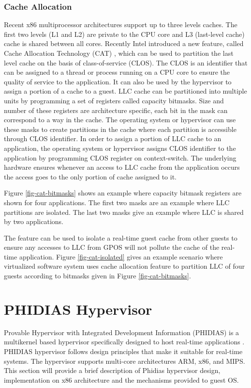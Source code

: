 

\subsubsection{Cache Allocation} \label{sec:cat}
Recent x86 multiprocessor architectures support up to three levels caches. 
The first two levels (L1 and L2) are private to the CPU core and L3 (last-level cache) cache is shared between all cores. 
Recently Intel introduced a new feature, called Cache Allocation Technology (CAT) \cite{intel-sdm-vol3}, which can be used to partition the last
level cache on the basis of class-of-service (CLOS). 
The CLOS is an identifier that can be assigned to a thread or process running on a CPU core to ensure the quality of service to the application. 
It can also be used by the hypervisor to assign a portion of a cache to a guest.
LLC cache can be partitioned into multiple units by programming a set of registers called capacity bitmasks. Size and number of these registers are
architecture specific, each bit in the mask can correspond to a way in the cache. 
The operating system or hypervisor can use these masks to create 
partitions in the cache where each partition is accessible through CLOS identifier. 
In order to assign a portion of LLC cache to an application,
the operating system or hypervisor assigns CLOS identifier to the application by programming CLOS register on context-switch.
The underlying hardware ensures whenever an access to LLC cache from the application occurs the access goes to the only portion of cache assigned to it.


Figure \ref{fig-cat-bitmasks} shows an example where capacity bitmask registers are shown for four applications. The first two masks are 
an example where LLC partitions are isolated. The last two masks give an example where LLC is shared by two applications.

The feature can be used to isolate a real-time guest cache from other guests to ensure any accesses to LLC from GPOS
will not pollute the cache of the real-time application. Figure \ref{fig-cat-isolated} gives an example scenario where virtualized software system
uses cache allocation feature to partition LLC of four guests according to bitmasks given in Figure \ref{fig-cat-bitmasks}.



\section{PHIDIAS Hypervisor}
Provable Hypervisor with Integrated Development Information (PHIDIAS) is a multikernel based hypervisor specifically designed to host real-time applications \cite{nordholz2017design}. 
PHIDIAS hypervisor follows design principles that make it suitable for real-time systems. 
The hypervisor supports multi-core architectures ARM, x86, and MIPS. This section will provide a brief description of Phidias hypervisor design, 
implementation on x86 architecture and the mechanisms provided to guest OS.

